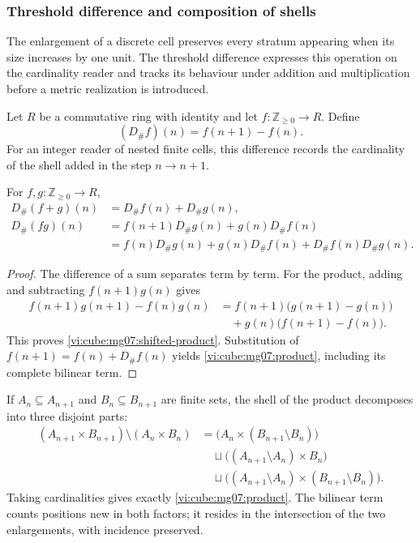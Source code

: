 \subsubsection{Threshold difference and composition of shells}
\label{vi:cube:mg07:threshold}

The enlargement of a discrete cell preserves every stratum appearing
when its size increases by one unit. The threshold difference expresses
this operation on the cardinality reader and tracks its behaviour under
addition and multiplication before a metric realization is introduced.

\begin{definition}
Let \(R\) be a commutative ring with identity and let
\(f:\mathbb Z_{\geq0}\to R\). Define
\begin{equation}
 (D_\#f)(n)=f(n+1)-f(n).
 \label{vi:cube:mg07:definition}
\end{equation}
For an integer reader of nested finite cells, this difference records
the cardinality of the shell added in the step \(n\to n+1\).
\end{definition}

\begin{proposition}
For \(f,g:\mathbb Z_{\geq0}\to R\),
\begin{align}
 D_\#(f+g)(n)&=D_\#f(n)+D_\#g(n),
 \label{vi:cube:mg07:additivity}\\
 D_\#(fg)(n)&=f(n+1)D_\#g(n)+g(n)D_\#f(n)
 \label{vi:cube:mg07:shifted-product}\\
 &=f(n)D_\#g(n)+g(n)D_\#f(n)
   +D_\#f(n)D_\#g(n).
 \label{vi:cube:mg07:product}
\end{align}
\end{proposition}

\begin{proof}
The difference of a sum separates term by term. For the product,
adding and subtracting \(f(n+1)g(n)\) gives
\[
 \begin{split}
 f(n+1)g(n+1)-f(n)g(n)
 &=f(n+1)\bigl(g(n+1)-g(n)\bigr)\\
 &\quad+g(n)\bigl(f(n+1)-f(n)\bigr).
 \end{split}
\]
This proves \eqref{vi:cube:mg07:shifted-product}. Substitution of
\(f(n+1)=f(n)+D_\#f(n)\) yields \eqref{vi:cube:mg07:product}, including
its complete bilinear term.
\end{proof}

If \(A_n\subseteq A_{n+1}\) and \(B_n\subseteq B_{n+1}\) are
finite sets, the shell of the product decomposes into three disjoint
parts:
\[
 \begin{split}
 (A_{n+1}\times B_{n+1})\setminus(A_n\times B_n)
 &=\bigl(A_n\times(B_{n+1}\setminus B_n)\bigr)\\
 &\quad\sqcup\bigl((A_{n+1}\setminus A_n)\times B_n\bigr)\\
 &\quad\sqcup\bigl((A_{n+1}\setminus A_n)
                 \times(B_{n+1}\setminus B_n)\bigr).
 \end{split}
\]
Taking cardinalities gives exactly \eqref{vi:cube:mg07:product}. The
bilinear term counts positions new in both factors; it resides in
the intersection of the two enlargements, with incidence preserved.


